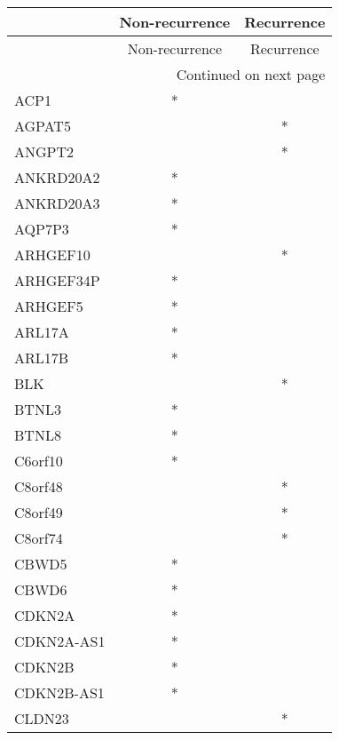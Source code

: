 \begin{longtable}{lcc}
\toprule
{} & Non-recurrence & Recurrence \\
\midrule
\endfirsthead

\toprule
{} & Non-recurrence & Recurrence \\
\midrule
\endhead
\midrule
\multicolumn{3}{r}{{Continued on next page}} \\
\midrule
\endfoot

\bottomrule
\endlastfoot
ACP1         &              * &            \\
AGPAT5       &                &          * \\
ANGPT2       &                &          * \\
ANKRD20A2    &              * &            \\
ANKRD20A3    &              * &            \\
AQP7P3       &              * &            \\
ARHGEF10     &                &          * \\
ARHGEF34P    &              * &            \\
ARHGEF5      &              * &            \\
ARL17A       &              * &            \\
ARL17B       &              * &            \\
BLK          &                &          * \\
BTNL3        &              * &            \\
BTNL8        &              * &            \\
C6orf10      &              * &            \\
C8orf48      &                &          * \\
C8orf49      &                &          * \\
C8orf74      &                &          * \\
CBWD5        &              * &            \\
CBWD6        &              * &            \\
CDKN2A       &              * &            \\
CDKN2A-AS1   &              * &            \\
CDKN2B       &              * &            \\
CDKN2B-AS1   &              * &            \\
CLDN23       &                &          * \\

\end{longtable}
